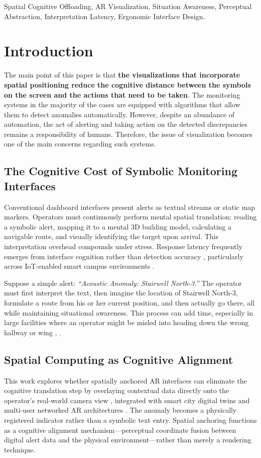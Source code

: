 \documentclass[conference]{IEEEtran}
\begin{document}
\begin{IEEEkeywords}
Spatial Cognitive Offloading, AR Visualization, Situation Awareness, Perceptual Abstraction, Interpretation Latency, Ergonomic Interface Design.
\end{IEEEkeywords}

\section{Introduction}

The main point of this paper is that \textbf{the visualizations that incorporate spatial positioning reduce the cognitive distance between the symbols on the screen and the actions that need to be taken}. The monitoring systems in the majority of the cases are equipped with algorithms that allow them to detect anomalies automatically. However, despite an abundance of automation, the act of alerting and taking action on the detected discrepancies remains a responsibility of humans. Therefore, the issue of visualization becomes one of the main concerns regarding such systems.

\subsection{The Cognitive Cost of Symbolic Monitoring Interfaces}
Conventional dashboard interfaces present alerts as textual streams or static map markers. Operators must continuously perform mental spatial translation: reading a symbolic alert, mapping it to a mental 3D building model, calculating a navigable route, and visually identifying the target upon arrival. This interpretation overhead compounds under stress. Response latency frequently emerges from interface cognition rather than detection accuracy \cite{b2, b29}, particularly across IoT-enabled smart campus environments \cite{b32}.

Suppose a simple alert: \textit{“Acoustic Anomaly: Stairwell North-3.”} The operator must first interpret the text, then imagine the location of Stairwell North-3, formulate a route from his or her current position, and then actually go there, all while maintaining situational awareness. This process can add time, especially in large facilities where an operator might be misled into heading down the wrong hallway or wing \cite{b3}, \cite{b30}.

\subsection{Spatial Computing as Cognitive Alignment}
This work explores whether spatially anchored AR interfaces can eliminate the cognitive translation step by overlaying contextual data directly onto the operator's real-world camera view \cite{b31, b20}, integrated with smart city digital twins \cite{b19} and multi-user networked AR architectures \cite{b21}. The anomaly becomes a physically registered indicator rather than a symbolic text entry. Spatial anchoring functions as a cognitive alignment mechanism---perceptual coordinate fusion between digital alert data and the physical environment---rather than merely a rendering technique.
\end{document}
